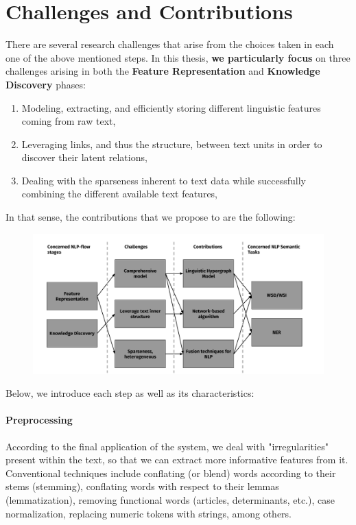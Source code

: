 \section{Challenges and Contributions}
There are several research challenges that arise from the choices taken in each one of the above mentioned steps. In this thesis,\textbf{ we particularly focus} on three challenges arising in both the \textbf{Feature Representation} and \textbf{Knowledge Discovery} phases:
\begin{enumerate}
 \item  Modeling, extracting, and efficiently storing different linguistic features coming from raw text,
 \item Leveraging links, and thus the structure, between text units in order to discover their latent relations, 
 \item Dealing with the sparseness inherent to text data while successfully combining the different available text features, 
\end{enumerate}

In that sense, the contributions that we propose to are the following:

\begin{figure}
\centering
\includegraphics[width=1\linewidth]{./images/Chapitre1/challenges_contribs.pdf}
\caption{}
\label{fig:challenges_contribs}
\end{figure}

 Below, we introduce each step as well as its characteristics:

\paragraph {Preprocessing}  According to the final application of the system, we deal with "irregularities" present within the text, so that we can extract more informative features from it. Conventional techniques include conflating (or blend) words according to their stems (stemming), conflating words with respect to their lemmas (lemmatization), removing functional words (articles, determinants, etc.), case normalization, replacing numeric tokens with strings, among others.

